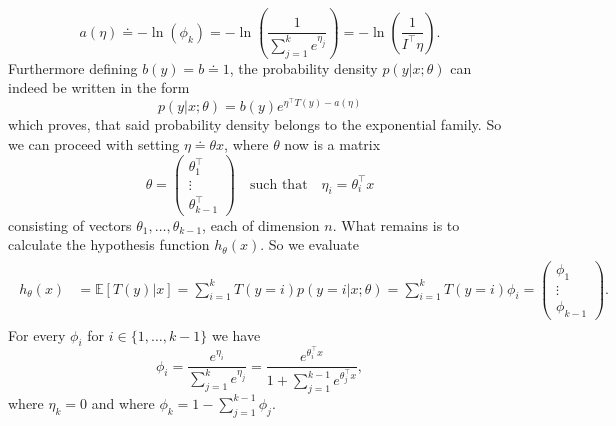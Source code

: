 \documentclass[a4paper,11pt]{article}
\numberwithin{equation}{section}
\begin{document}
{\begin{equation} a(\eta) \doteq -\ln(\phi_k) = -\ln\left(\frac{1}{\sum_{j=1}^k e^{\eta_j}}\right) = -\ln\left(\frac{1}{I^\top \eta}\right).
\end{equation} Furthermore defining $b(y) = b \doteq 1$, the probability density $p(y|x;\theta)$ can indeed be written in the form \begin{equation}
p(y|x;\theta) = b(y)e^{\eta^\top T(y) - a(\eta)}
\end{equation} which proves, that said probability density belongs to the exponential family. So we can proceed with setting $\eta \doteq \theta x$, where $\theta$ now is a matrix \begin{equation}
\theta = \begin{pmatrix}
	\theta_1^\top \\ \vdots \\ \theta_{k-1}^\top
\end{pmatrix} \quad \text{such that} \quad \eta_i = \theta_i^\top x
\end{equation} consisting of vectors $\theta_1,\dots,\theta_{k-1}$, each of dimension $n$. What remains is to calculate the hypothesis function $h_\theta(x)$. So we evaluate \begin{align}
\begin{aligned}
	h_\theta(x) &= \mathbb{E}[T(y)|x] = \sum_{i=1}^{k}T(y=i) p(y=i|x;\theta)=\sum_{i=1}^k T(y=i) \phi_i = \begin{pmatrix}
		\phi_1 \\ \vdots \\ \phi_{k-1}
	\end{pmatrix}.
\end{aligned}
\end{align} For every $\phi_i$ for $i \in \{1,\dots,k-1\}$ we have \begin{equation}
\phi_i = \frac{e^{\eta_i}}{\sum_{j=1}^{k}e^{\eta_j}} = \frac{e^{\theta_i^\top x}}{1+\sum_{j=1}^{k-1}e^{\theta_j^\top x}},
\end{equation} where $\eta_k=0$ and where $\phi_k = 1-\sum_{j=1}^{k-1}\phi_j$.

}
\end{document}
